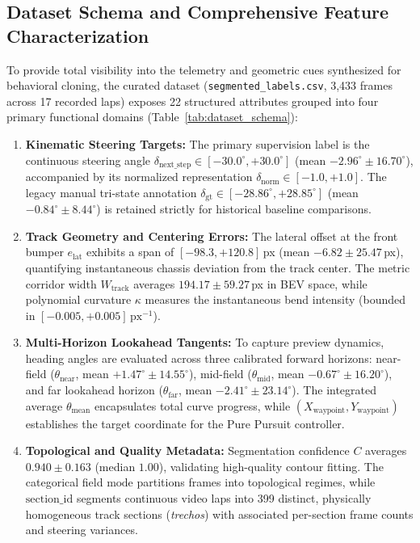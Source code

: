 \documentclass[10pt,journal,compsoc]{IEEEtran}
\begin{document}
\subsection{Dataset Schema and Comprehensive Feature Characterization}
\label{sec:dataset_features}
To provide total visibility into the telemetry and geometric cues synthesized for behavioral cloning, the curated dataset (\texttt{segmented\_labels.csv}, 3,433 frames across 17 recorded laps) exposes 22 structured attributes grouped into four primary functional domains (Table~\ref{tab:dataset_schema}):

\begin{enumerate}
    \item \textbf{Kinematic Steering Targets:} The primary supervision label is the continuous steering angle $\delta_{\text{next\_step}} \in [-30.0^\circ, +30.0^\circ]$ (mean $-2.96^\circ \pm 16.70^\circ$), accompanied by its normalized representation $\delta_{\text{norm}} \in [-1.0, +1.0]$. The legacy manual tri-state annotation $\delta_{\text{gt}} \in [-28.86^\circ, +28.85^\circ]$ (mean $-0.84^\circ \pm 8.44^\circ$) is retained strictly for historical baseline comparisons.
    \item \textbf{Track Geometry and Centering Errors:} The lateral offset at the front bumper $e_{\text{lat}}$ exhibits a span of $[-98.3, +120.8]$\,px (mean $-6.82 \pm 25.47$\,px), quantifying instantaneous chassis deviation from the track center. The metric corridor width $W_{\text{track}}$ averages $194.17 \pm 59.27$\,px in BEV space, while polynomial curvature $\kappa$ measures the instantaneous bend intensity (bounded in $[-0.005, +0.005]$\,$\text{px}^{-1}$).
    \item \textbf{Multi-Horizon Lookahead Tangents:} To capture preview dynamics, heading angles are evaluated across three calibrated forward horizons: near-field ($\theta_{\text{near}}$, mean $+1.47^\circ \pm 14.55^\circ$), mid-field ($\theta_{\text{mid}}$, mean $-0.67^\circ \pm 16.20^\circ$), and far lookahead horizon ($\theta_{\text{far}}$, mean $-2.41^\circ \pm 23.14^\circ$). The integrated average $\theta_{\text{mean}}$ encapsulates total curve progress, while $(X_{\text{waypoint}}, Y_{\text{waypoint}})$ establishes the target coordinate for the Pure Pursuit controller.
    \item \textbf{Topological and Quality Metadata:} Segmentation confidence $C$ averages $0.940 \pm 0.163$ (median $1.00$), validating high-quality contour fitting. The categorical field $\text{mode}$ partitions frames into topological regimes, while $\text{section\_id}$ segments continuous video laps into 399 distinct, physically homogeneous track sections (\textit{trechos}) with associated per-section frame counts and steering variances.
\end{enumerate}
\end{document}
